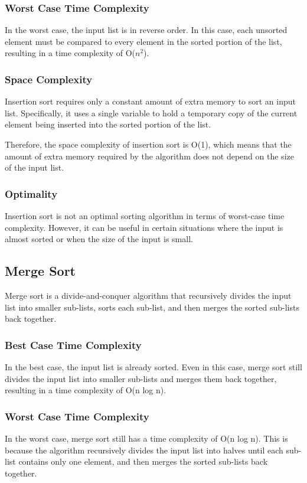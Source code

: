\documentclass[a4paper, 11pt, oneside]{book} %
\begin{document}
\subsubsection{Worst Case Time Complexity}
In the worst case, the input list is in reverse order. In this case, each unsorted element must be compared to every element in the sorted portion of the list, resulting in a time complexity of O($n^2$).

\subsubsection{Space Complexity}
Insertion sort requires only a constant amount of extra memory to sort an input list. Specifically, it uses a single variable to hold a temporary copy of the current element being inserted into the sorted portion of the list.

Therefore, the space complexity of insertion sort is O(1), which means that the amount of extra memory required by the algorithm does not depend on the size of the input list.

\subsubsection{Optimality}
Insertion sort is not an optimal sorting algorithm in terms of worst-case time complexity. However, it can be useful in certain situations where the input is almost sorted or when the size of the input is small.

\subsection{Merge Sort}
Merge sort is a divide-and-conquer algorithm that recursively divides the input list into smaller sub-lists, sorts each sub-list, and then merges the sorted sub-lists back together.
\subsubsection{Best Case Time Complexity}
In the best case, the input list is already sorted. Even in this case, merge sort still divides the input list into smaller sub-lists and merges them back together, resulting in a time complexity of O(n log n).


\subsubsection{Worst Case Time Complexity}
In the worst case, merge sort still has a time complexity of O(n log n). This is because the algorithm recursively divides the input list into halves until each sub-list contains only one element, and then merges the sorted sub-lists back together.
\end{document}
